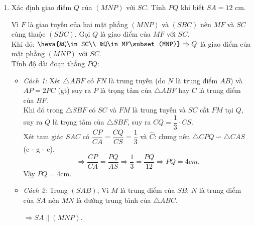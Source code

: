 \begin{bt}
\begin{bt}
{\begin{enumerate}[1.]
\begin{enumerate}[1.1.]
				\item Do $NP$ không song song với $BC$ và cùng nằm trên mặt phẳng $(ABC)$ nên gọi $F$ là giao điểm của $NP$ và $BC$ kéo dài.\\
				Ta có $\heva{&F\in BC\\ &BC\subset (SBC)}$ và $\heva{&F\in NP\\ &NP\subset (MNP)}$ $\Rightarrow \heva{&F\in (SBC)\\ &F\in (MNP)} \Rightarrow F$ là điểm chung thứ nhất của hai mặt phẳng $(MNP)$ và $(SBC)$. $\quad (3)$\\
				Tương tự, $M$ là điểm chung thứ hai của hai mặt phẳng $(MNP)$ và $(SBC)$. $\quad (4)$\\
				Từ $(3)$ và $(4)$, suy ra giao tuyến của hai mặt phẳng $(MNP)$ và $(SBC)$ là đường thẳng $MF$.
			\end{enumerate}
			\item Xác định giao điểm $Q$ của $(MNP)$ với $SC$. Tính $PQ$ khi biết $SA=12$ cm.
			
			Vì $F$ là giao tuyến của hai mặt phẳng $(MNP)$ và $(SBC)$ nên $MF$ và $SC$ cùng thuộc $(SBC)$. Gọi $Q$ là giao điểm của $MF$ với $SC$.\\
			Khi đó: $\heva{&Q\in SC\\ &Q\in MF\subset (MNP)}\Rightarrow Q$ là giao điểm của mặt phẳng $(MNP)$ với $SC$.\\
			Tính độ dài đoạn thẳng $PQ$:
			\begin{itemize}
				\item \textit{Cách 1:} Xét $\triangle ABF$ có $FN$ là trung tuyến (do $N$ là trung điểm $AB$) và $AP=2PC$ (gt) suy ra $P$ là trọng tâm của $\triangle ABF$ hay $C$ là trung điểm của $BF$.\\
				Khi đó trong $\triangle SBF$ có $SC$ và $FM$ là trung tuyến và $SC$ cắt $FM$ tại $Q$, suy ra $Q$ là trọng tâm của $\triangle SBF$, suy ra $CQ=\dfrac{1}{3}\cdot CS$.\\
				Xét tam giác $SAC$ có $\dfrac{CP}{CA}=\dfrac{CQ}{CS}=\dfrac{1}{3}$ và $\widehat C$: chung nên $\triangle CPQ \backsim \triangle CAS$ (c - g - c).
				$$\Rightarrow \dfrac{CP}{CA}=\dfrac{PQ}{AS}
				\Rightarrow \dfrac{1}{3}=\dfrac{PQ}{12}
				\Rightarrow PQ=4cm.$$
				Vậy $PQ=4$cm.
				\item \textit{Cách 2:} Trong $(SAB)$, Vì $M$ là trung điểm của $SB$; $N$ là trung điểm của $SA$ nên $MN$ là đường trung bình của $\triangle ABC$.
				
				$\Rightarrow SA\parallel (MNP)$.
				

\end{itemize}
\end{enumerate}}
\end{bt}
\end{bt}
